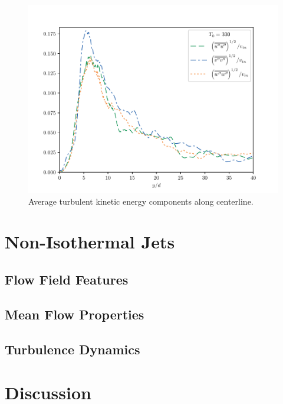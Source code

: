 \begin{figure}[H]
\begin{center}
	\includegraphics[scale=.7]{figures/Plots/centerline/330_TKEuvw_centerline.pdf}
	\caption{Average turbulent kinetic energy components along centerline.} \label{330_TKE_features}
\end{center}
\end{figure}

\section{Non-Isothermal Jets}
\subsection{Flow Field Features}

\subsection{Mean Flow Properties}
\subsection{Turbulence Dynamics}
\section{Discussion}



